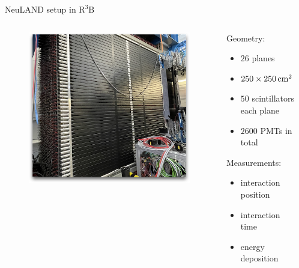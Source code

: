 \documentclass{ikpKoeln}
\begin{document}
{\begin{frame}{NeuLAND setup in $\text{R}^3\text{B}$}
	\begin{columns}[c]
		\begin{column}{0.4\textwidth}
			\pause
			\begin{figure}
				\includegraphics[width = \textwidth]{neuland/neulandReal}
			\end{figure}
		\end{column}
		\hspace*{0.5cm}
		\begin{column}{0.3\textwidth}
			\begin{exampleblock}{}
				Geometry:\\
				\begin{itemize}
					\item $26$ planes
					\item $\qtyproduct[product-units=power]{250 x 250}{\centi\meter}$
					\item $50$ scintillators each plane
					\item $2600$ PMTs in total
				\end{itemize}
				\pause
				Measurements:\\
				\begin{itemize}
					\item interaction position
					\item interaction time
					\item energy deposition
				\end{itemize}
			\end{exampleblock}
		\end{column}
		\begin{column}{0.3\textwidth}
		\end{column}
	\end{columns}
	\let\thefootnote\relax{}
\end{frame}
}
\end{document}
